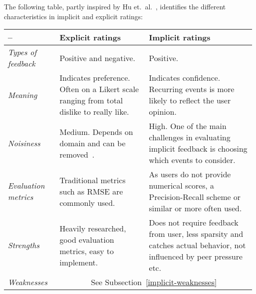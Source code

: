 The following table, partly inspired by Hu et.\ al.~\cite{Hu2008}, identifies
the different characteristics in implicit and explicit ratings:

\begin{table}[H]
    \begin{tabular}{l p{6cm} p{6cm}}
    \toprule
    –                  & \textbf{Explicit ratings}
                       & \textbf{Implicit ratings} \\ \midrule

    \textit{Types of feedback}  
                       & Positive and negative.
                       & Positive. \\ \midrule

    \textit{Meaning}
                       & Indicates preference. Often on a Likert scale ranging
                         from total dislike to really like.
                       & Indicates confidence. Recurring events is more likely
                         to reflect the user opinion. 
                         \\ \midrule

    \textit{Noisiness}
                       & Medium. Depends on domain and can be removed~\cite{amatriain2009like}.
                       & High. One of the main challenges in evaluating
                         implicit feedback is choosing which events to
                         consider. \\ \midrule

    \textit{Evaluation metrics}
                       & Traditional metrics such as RMSE are commonly used.
                       & As users do not provide numerical scores, a
                         Precision-Recall scheme or similar or more often used.
                         \\ \midrule

    \textit{Strengths}
                       & Heavily researched, good evaluation metrics, easy to
                         implement.
                       & Does not require feedback from user, less sparsity and
                         catches actual behavior, not influenced by peer
                         pressure etc. \\ \midrule

    \textit{Weaknesses}
                       & \multicolumn{2}{c}{See Subsection~\ref{implicit-weaknesses}} \\
    \bottomrule
    \end{tabular}
\end{table}

